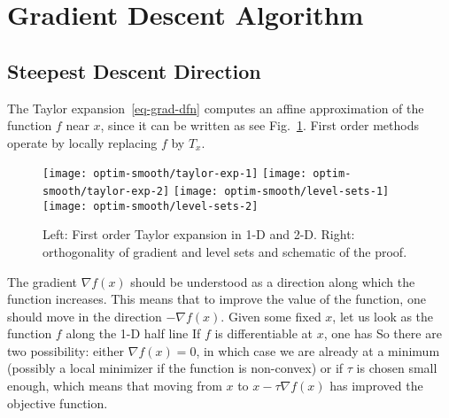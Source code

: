 \section{Gradient Descent Algorithm}
\label{sec-grad-desc-basic}


\subsection{Steepest Descent Direction}

The Taylor expansion~\eqref{eq-grad-dfn} computes an affine approximation of the function $f$ near $x$, since it can be written as
see Fig.~\ref{fig-expansion-taylor}. First order methods operate by locally replacing $f$ by $T_x$.


\begin{figure}
\centering
\texttt{[image: optim-smooth/taylor-exp-1]} \quad
\texttt{[image: optim-smooth/taylor-exp-2]} \quad
\texttt{[image: optim-smooth/level-sets-1]} \quad
\texttt{[image: optim-smooth/level-sets-2]} 
\caption{\label{fig-expansion-taylor}
	Left: First order Taylor expansion in 1-D and 2-D.
	Right: orthogonality of gradient and level sets and schematic of the proof.
}
\end{figure}

The gradient $\nabla f(x)$ should be understood as a direction along which the function increases. This means that to improve the value of the function, one should move in the direction $-\nabla f(x)$. Given some fixed $x$, let us look as the function $f$ along the 1-D half line 
\eq{ 
	\tau \in \RR^+ = [0,+\infty[ \longmapsto f(x-\tau \nabla f(x)) \in \RR.
}
If $f$ is differentiable at $x$, one has 
So there are two possibility: either $\nabla f(x)=0$, in which case we are already at a minimum (possibly a local minimizer if the function is non-convex) or if $\tau$ is chosen small enough, 
which means that moving from $x$ to $x-\tau \nabla f(x)$ has improved the objective function. 

